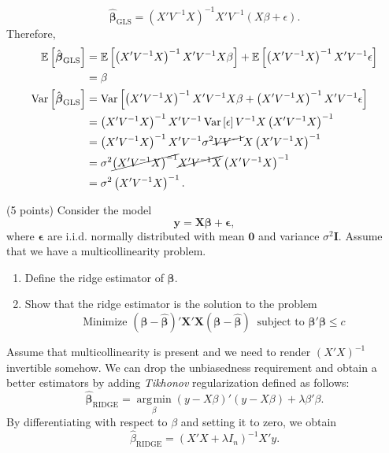 \documentclass[answers]{exam}
\DeclareMathOperator{\argmin}{\arg\!\min}
\newcommand{\bs}{\boldsymbol}
\newcommand{\opn}{\operatorname}
\begin{document}
\begin{questions}
\begin{solution}
      $$
         \hat{\bs{\beta}}_{\text{GLS}} = \left(X'V^{-1}X\right)^{-1}X'V^{-1}\left(X\beta + \epsilon\right).
      $$
      Therefore,
      \begin{align*}
         \mathbb{E}\left[\hat{\bs{\beta}}_{\text{GLS}}\right] &= \mathbb{E}\left[\left(X'V^{-1}X\right)^{-1}X'V^{-1}X\beta\right] +\mathbb{E}\left[\left(X'V^{-1}X\right)^{-1}X'V^{-1}\epsilon\right]\\
         &= \beta\\
         \opn{Var}\left[\hat{\bs{\beta}}_{\text{GLS}}\right] &= \opn{Var}\left[\left(X'V^{-1}X\right)^{-1}X'V^{-1}X\beta + \left(X'V^{-1}X\right)^{-1}X'V^{-1}\epsilon\right]\\
         &= \left(X'V^{-1}X\right)^{-1}X'V^{-1}\opn{Var}\left[\epsilon\right]V^{-1}X\left(X'V^{-1}X\right)^{-1}\\
         &= \left(X'V^{-1}X\right)^{-1}X'V^{-1}\sigma^{2}\cancel{VV^{-1}}X\left(X'V^{-1}X\right)^{-1} \\
         &=\sigma^{2}\cancel{\left(X'V^{-1}X\right)^{-1}}\cancel{X'V^{-1}X}\left(X'V^{-1}X\right)^{-1} \\
         &= \sigma^{2}\left(X'V^{-1}X\right)^{-1}.
      \end{align*}
   \end{solution}
   \question
   (5 points) Consider the model
   $$
      \bs{y} = \bs{X\beta} + \bs{\epsilon},
   $$
   where $\bs{\epsilon}$ are i.i.d. normally distributed with mean $\bs{0}$ and variance $\sigma^{2}\bs{I}$. Assume that we have a multicollinearity problem.
   \begin{enumerate}[label=(\alph*)]
      \item Define the ridge estimator of $\bs{\beta}$.
      \item Show that the ridge estimator is the solution to the problem
      $$
      \text{Minimize }\left(\bs{\beta} - \hat{\bs{\beta}}\right)'\bs{X}'\bs{X}\left(\bs{\beta}-\hat{\bs{\beta}}\right)\;\; \text{subject to } \bs{\beta}'\bs{\beta} \leq c
      $$
   \end{enumerate}
   \begin{solution}
      Assume that multicollinearity is present and we need to render $\left(X'X\right)^{-1}$ invertible somehow. We can drop the unbiasedness requirement and obtain a better estimators by adding \emph{Tikhonov} regularization defined as follows:
      $$
         \hat{\bs{\beta}}_{\text{RIDGE}} = \argmin\limits_{\beta} \left(y-X\beta\right)'\left(y-X\beta\right) + \lambda\beta'\beta.
      $$
      By differentiating with respect to $\beta$ and setting it to zero, we obtain
      $$
      \hat{\beta}_{\text{RIDGE}} = \left(X'X+\lambda I_{n}\right)^{-1}X'y.
      $$
   \end{solution}
   \begin{solution}


\end{solution}
\end{questions}
\end{document}
